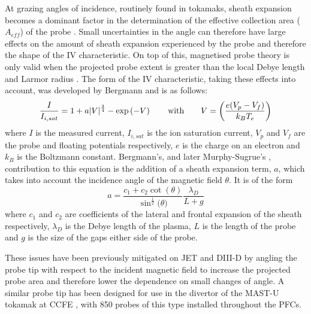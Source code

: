 \documentclass[a4paper, 12pt]{article} %
\begin{document}
	At grazing angles of incidence, routinely found in tokamaks, sheath expansion becomes a dominant factor in the determination of the effective collection area ($A_{eff}$) of the probe \cite{Bergmann1994}. 
	Small uncertainties in the angle can therefore have large effects on the amount of sheath expansion experienced by the probe and therefore the shape of the IV characteristic.
	On top of this, magnetised probe theory is only valid when the projected probe extent is greater than the local Debye length and Larmor radius \cite{Gunn1995}. 
	The form of the IV characteristic, taking these effects into account, was developed by Bergmann \cite{Bergmann2002} and is as follows:
	\begin{equation}
	\label{eq:ivcurvesheathexp}
	\frac{I}{I_{i,sat}} =  1 + a |V|^{\frac{3}{4}} - \exp\left({-V}\right) \qquad \textnormal{with} \qquad  V = \bigg(\frac{e(V_p - V_f)}{k_B T_e}\bigg)
	\end{equation}
	where $I$ is the measured current, $I_{i,sat}$ is the ion saturation current, $V_p$ and $V_f$ are the probe and floating potentials respectively, $e$ is the charge on an electron and $k_B$ is the Boltzmann constant. 
	Bergmann's, and later Murphy-Sugrue's \cite{Murphy-Sugrue2017}, contribution to this equation is the addition of a sheath expansion term, $a$, which takes into account the incidence angle of the magnetic field $\theta$. 
	It is of the form
	\begin{equation}
	\label{eq:sheathexpparam}
	a =  \frac{c_1 + c_2  \cot{(\theta)}}{\sin^{\frac{1}{2}}{(\theta})} \frac{\lambda_D}{L + g}
	\end{equation}
	where $c_1$ and $c_2$ are coefficients of the lateral and frontal expansion of the sheath respectively, $\lambda_D$ is the Debye length of the plasma, $L$ is the length of the probe and $g$ is the size of the gaps either side of the probe.
	
	These issues have been previously mitigated on JET\cite{Monk1996} and DIII-D by angling the probe tip with respect to the incident magnetic field to increase the projected probe area and therefore lower the dependence on small changes of angle. 
	A similar probe tip has been designed for use in the divertor of the MAST-U tokamak at CCFE \cite{Harrison}, with 850 probes of this type installed throughout the PFCs.
	
\end{document}
